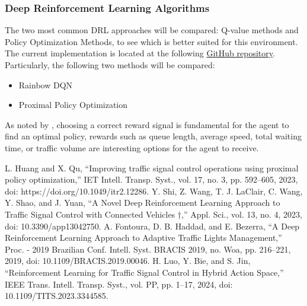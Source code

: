 \documentclass{Supervised_Reinforcement_Learningqsport}
\begin{document}
\subsubsection{Deep Reinforcement Learning Algorithms}

The two most common DRL approaches will be compared: Q-value methods and Policy Optimization Methods, to see which is better suited for this environment. The current implementation is located at the following \href{https://github.com/jazg97/TrafficSignalControl-RL}{GitHub repository}. Particularly, the following two methods will be compared:

\begin{itemize}
\item{Rainbow DQN}
\item{Proximal Policy Optimization}
\end{itemize}

As noted by \cite{ref3}, choosing a correct reward signal is fundamental for the agent to find an optimal policy, rewards such as queue length, average speed, total waiting time, or traffic volume are interesting options for the agent to receive.

\begin{thebibliography}{99}
 L. Huang and X. Qu, “Improving traffic signal control operations using proximal policy optimization,” IET Intell. Transp. Syst., vol. 17, no. 3, pp. 592–605, 2023, doi: https://doi.org/10.1049/itr2.12286.
 Y. Shi, Z. Wang, T. J. LaClair, C. Wang, Y. Shao, and J. Yuan, “A Novel Deep Reinforcement Learning Approach to Traffic Signal Control with Connected Vehicles †,” Appl. Sci., vol. 13, no. 4, 2023, doi: 10.3390/app13042750.
 A. Fontoura, D. B. Haddad, and E. Bezerra, “A Deep Reinforcement Learning Approach to Adaptive Traffic Lights Management,” Proc. - 2019 Brazilian Conf. Intell. Syst. BRACIS 2019, no. Woa, pp. 216–221, 2019, doi: 10.1109/BRACIS.2019.00046.
 H. Luo, Y. Bie, and S. Jin, “Reinforcement Learning for Traffic Signal Control in Hybrid Action Space,” IEEE Trans. Intell. Transp. Syst., vol. PP, pp. 1–17, 2024, doi: 10.1109/TITS.2023.3344585.
\end{thebibliography}
\end{document}

